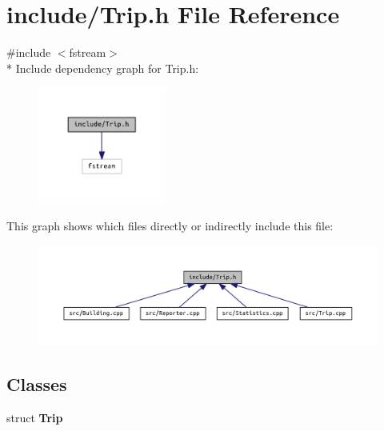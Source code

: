 \section{include/\+Trip.h File Reference}
\label{_trip_8h}
{\ttfamily \#include $<$fstream$>$}\\*
Include dependency graph for Trip.\+h\+:\nopagebreak
\begin{figure}[H]
\begin{center}
\leavevmode
\includegraphics[width=119pt]{_trip_8h__incl}
\end{center}
\end{figure}
This graph shows which files directly or indirectly include this file\+:\nopagebreak
\begin{figure}[H]
\begin{center}
\leavevmode
\includegraphics[width=350pt]{_trip_8h__dep__incl}
\end{center}
\end{figure}
\subsection*{Classes}
\begin{DoxyCompactItemize}
\item 
struct {\bf Trip}
\end{DoxyCompactItemize}
